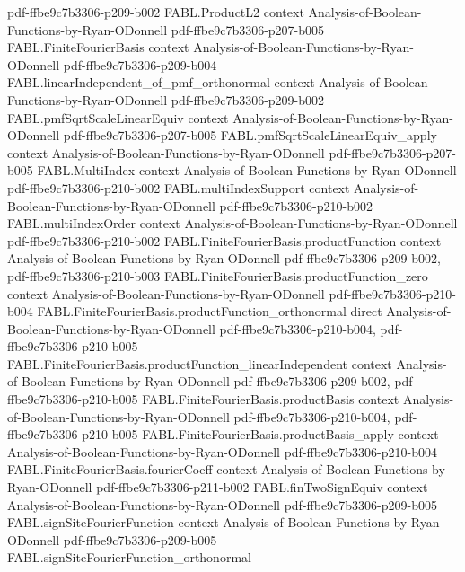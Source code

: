 \begin{theorem}
  {pdf-ffbe9c7b3306-p209-b002}
\proofstep
  {FABL.ProductL2}
  {context}
  {Analysis-of-Boolean-Functions-by-Ryan-ODonnell}
  {pdf-ffbe9c7b3306-p207-b005}
\proofstep
  {FABL.FiniteFourierBasis}
  {context}
  {Analysis-of-Boolean-Functions-by-Ryan-ODonnell}
  {pdf-ffbe9c7b3306-p209-b004}
\proofstep
  {FABL.linearIndependent_of_pmf_orthonormal}
  {context}
  {Analysis-of-Boolean-Functions-by-Ryan-ODonnell}
  {pdf-ffbe9c7b3306-p209-b002}
\proofstep
  {FABL.pmfSqrtScaleLinearEquiv}
  {context}
  {Analysis-of-Boolean-Functions-by-Ryan-ODonnell}
  {pdf-ffbe9c7b3306-p207-b005}
\proofstep
  {FABL.pmfSqrtScaleLinearEquiv_apply}
  {context}
  {Analysis-of-Boolean-Functions-by-Ryan-ODonnell}
  {pdf-ffbe9c7b3306-p207-b005}
\proofstep
  {FABL.MultiIndex}
  {context}
  {Analysis-of-Boolean-Functions-by-Ryan-ODonnell}
  {pdf-ffbe9c7b3306-p210-b002}
\proofstep
  {FABL.multiIndexSupport}
  {context}
  {Analysis-of-Boolean-Functions-by-Ryan-ODonnell}
  {pdf-ffbe9c7b3306-p210-b002}
\proofstep
  {FABL.multiIndexOrder}
  {context}
  {Analysis-of-Boolean-Functions-by-Ryan-ODonnell}
  {pdf-ffbe9c7b3306-p210-b002}
\proofstep
  {FABL.FiniteFourierBasis.productFunction}
  {context}
  {Analysis-of-Boolean-Functions-by-Ryan-ODonnell}
  {pdf-ffbe9c7b3306-p209-b002,
    pdf-ffbe9c7b3306-p210-b003}
\proofstep
  {FABL.FiniteFourierBasis.productFunction_zero}
  {context}
  {Analysis-of-Boolean-Functions-by-Ryan-ODonnell}
  {pdf-ffbe9c7b3306-p210-b004}
\proofstep
  {FABL.FiniteFourierBasis.productFunction_orthonormal}
  {direct}
  {Analysis-of-Boolean-Functions-by-Ryan-ODonnell}
  {pdf-ffbe9c7b3306-p210-b004,
    pdf-ffbe9c7b3306-p210-b005}
\proofstep
  {FABL.FiniteFourierBasis.productFunction_linearIndependent}
  {context}
  {Analysis-of-Boolean-Functions-by-Ryan-ODonnell}
  {pdf-ffbe9c7b3306-p209-b002,
    pdf-ffbe9c7b3306-p210-b005}
\proofstep
  {FABL.FiniteFourierBasis.productBasis}
  {context}
  {Analysis-of-Boolean-Functions-by-Ryan-ODonnell}
  {pdf-ffbe9c7b3306-p210-b004,
    pdf-ffbe9c7b3306-p210-b005}
\proofstep
  {FABL.FiniteFourierBasis.productBasis_apply}
  {context}
  {Analysis-of-Boolean-Functions-by-Ryan-ODonnell}
  {pdf-ffbe9c7b3306-p210-b004}
\proofstep
  {FABL.FiniteFourierBasis.fourierCoeff}
  {context}
  {Analysis-of-Boolean-Functions-by-Ryan-ODonnell}
  {pdf-ffbe9c7b3306-p211-b002}
\proofstep
  {FABL.finTwoSignEquiv}
  {context}
  {Analysis-of-Boolean-Functions-by-Ryan-ODonnell}
  {pdf-ffbe9c7b3306-p209-b005}
\proofstep
  {FABL.signSiteFourierFunction}
  {context}
  {Analysis-of-Boolean-Functions-by-Ryan-ODonnell}
  {pdf-ffbe9c7b3306-p209-b005}
\proofstep
  {FABL.signSiteFourierFunction_orthonormal}

\end{theorem}
